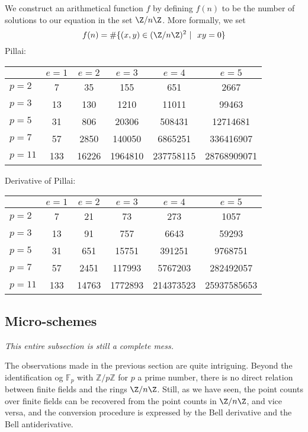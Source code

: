 We construct an arithmetical function $f$ by defining $f(n)$ to be the number of solutions to our equation in the set $\Z / n \Z$. More formally, we set
$$  f(n) = \# \{  (x, y) \in (\Z / n \Z)^2 \  \vert \ \   xy = 0   \}   $$
Pillai:
\begin{table}[h]
\centering
\begin{tabular}{| l | | c | c | c | c | c |}
\hline
& $e = 1$ & $e = 2$ & $e = 3$ & $e = 4$ & $e = 5$\\
\hline
\hline
$p = 2$ & 7 & 35 & 155 & 651 & 2667 \\
\hline
$p = 3$ & 13 & 130 & 1210 & 11011 & 99463 \\
\hline
$p = 5$ & 31 & 806 & 20306 & 508431 & 12714681 \\
\hline
$p = 7$ & 57 & 2850 & 140050 & 6865251 & 336416907 \\
\hline
$p = 11$ & 133 & 16226 & 1964810 & 237758115 & 28768909071 \\
\hline
\end{tabular}
\end{table}

Derivative of Pillai:
\begin{table}[h]
\centering
\begin{tabular}{| l | | c | c | c | c | c |}
\hline
& $e = 1$ & $e = 2$ & $e = 3$ & $e = 4$ & $e = 5$\\
\hline
\hline
$p = 2$ & 7 & 21 & 73 & 273 & 1057 \\
\hline
$p = 3$ & 13 & 91 & 757 & 6643 & 59293 \\
\hline
$p = 5$ & 31 & 651 & 15751 & 391251 & 9768751 \\
\hline
$p = 7$ & 57 & 2451 & 117993 & 5767203 & 282492057 \\
\hline
$p = 11$ & 133 & 14763 & 1772893 & 214373523 & 25937585653 \\
\hline
\end{tabular}
\end{table}




\subsection{Micro-schemes}


\emph{This entire subsection is still a complete mess.}

The observations made in the previous section are quite intriguing. Beyond the identification og $\mathbb{F}_p$ with $\mathbb{Z} / p \mathbb{Z}$ for $p$ a prime number, there is no direct relation between finite fields and the rings $\Z / n \Z$. Still, as we have seen, the point counts over finite fields can be recovered from the point counts in $\Z / n \Z$, and vice versa, and the conversion procedure is expressed by the Bell derivative and the Bell antiderivative.


